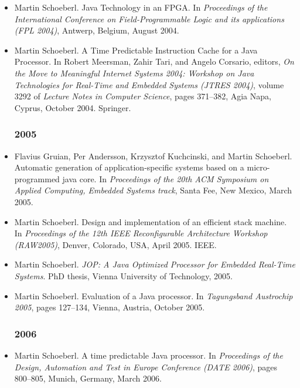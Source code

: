 \begin{itemize}
\item Martin Schoeberl.
 {J}ava Technology in an {FPGA}.
 In {\em Proceedings of the International Conference on
  Field-Programmable Logic and its applications (FPL 2004)}, Antwerp, Belgium,
  August 2004.

\item Martin Schoeberl.
 A Time Predictable Instruction Cache for a Java Processor.
 In Robert Meersman, Zahir Tari, and Angelo Corsario, editors, {\em On
  the Move to Meaningful Internet Systems 2004: Workshop on {J}ava Technologies
  for Real-Time and Embedded Systems (JTRES 2004)}, volume 3292 of {\em
  Lecture Notes in Computer Science}, pages 371--382, Agia Napa, Cyprus,
  October 2004. Springer.

\subsubsection*{2005}

\item Flavius Gruian, Per Andersson, Krzysztof Kuchcinski, and Martin Schoeberl.
 Automatic generation of application-specific systems based on a
  micro-programmed java core.
 In {\em Proceedings of the 20th ACM Symposium on Applied Computing,
  Embedded Systems track}, Santa Fee, New Mexico, March 2005.

\item Martin Schoeberl.
 Design and implementation of an efficient stack machine.
 In {\em Proceedings of the 12th IEEE Reconfigurable Architecture
  Workshop (RAW2005)}, Denver, Colorado, USA, April 2005. IEEE.

\item Martin Schoeberl.
 {\em JOP: A Java Optimized Processor for Embedded Real-Time Systems}.
 PhD thesis, Vienna University of Technology, 2005.

\item Martin Schoeberl.
 Evaluation of a {J}ava processor.
 In {\em Tagungsband Austrochip 2005}, pages 127--134, Vienna,
  Austria, October 2005.

\subsubsection*{2006}

\item Martin Schoeberl.
 A time predictable {J}ava processor.
 In {\em Proceedings of the Design, Automation and Test in Europe
  Conference (DATE 2006)}, pages 800--805, Munich, Germany, March 2006.


\end{itemize}
